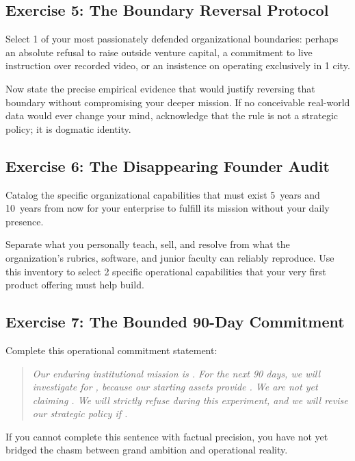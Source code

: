 \subsection{Exercise 5: The Boundary Reversal Protocol}

Select 1 of your most passionately defended organizational boundaries: perhaps an absolute refusal to raise outside venture capital, a commitment to live instruction over recorded video, or an insistence on operating exclusively in 1 city.

Now state the precise empirical evidence that would justify reversing that boundary without compromising your deeper mission. If no conceivable real-world data would ever change your mind, acknowledge that the rule is not a strategic policy; it is dogmatic identity.

\subsection{Exercise 6: The Disappearing Founder Audit}

Catalog the specific organizational capabilities that must exist 5~years and 10~years from now for your enterprise to fulfill its mission without your daily presence.

Separate what you personally teach, sell, and resolve from what the organization's rubrics, software, and junior faculty can reliably reproduce. Use this inventory to select 2 specific operational capabilities that your very first product offering must help build.

\subsection{Exercise 7: The Bounded 90-Day Commitment}

Complete this operational commitment statement:

\begin{quote}
\itshape
Our enduring institutional mission is \underline{\hspace{3cm}}. For the next 90 days, we will investigate \underline{\hspace{2.5cm}} for \underline{\hspace{2.5cm}}, because our starting assets provide \underline{\hspace{3cm}}. We are not yet claiming \underline{\hspace{2.5cm}}. We will strictly refuse \underline{\hspace{2.5cm}} during this experiment, and we will revise our strategic policy if \underline{\hspace{3cm}}.
\end{quote}

If you cannot complete this sentence with factual precision, you have not yet bridged the chasm between grand ambition and operational reality.
